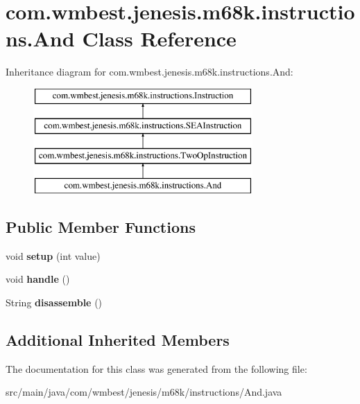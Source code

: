 \hypertarget{classcom_1_1wmbest_1_1jenesis_1_1m68k_1_1instructions_1_1And}{\section{com.\-wmbest.\-jenesis.\-m68k.\-instructions.\-And Class Reference}
\label{classcom_1_1wmbest_1_1jenesis_1_1m68k_1_1instructions_1_1And}
}
Inheritance diagram for com.\-wmbest.\-jenesis.\-m68k.\-instructions.\-And\-:\begin{figure}[H]
\begin{center}
\leavevmode
\includegraphics[height=4.000000cm]{classcom_1_1wmbest_1_1jenesis_1_1m68k_1_1instructions_1_1And}
\end{center}
\end{figure}
\subsection*{Public Member Functions}
\begin{DoxyCompactItemize}
\item 
\hypertarget{classcom_1_1wmbest_1_1jenesis_1_1m68k_1_1instructions_1_1And_a07f235df047551864221dd47fc2d9ad7}{void {\bfseries setup} (int value)}\label{classcom_1_1wmbest_1_1jenesis_1_1m68k_1_1instructions_1_1And_a07f235df047551864221dd47fc2d9ad7}

\item 
\hypertarget{classcom_1_1wmbest_1_1jenesis_1_1m68k_1_1instructions_1_1And_aab736f92fc0f72bbb3d21745bd3350dc}{void {\bfseries handle} ()}\label{classcom_1_1wmbest_1_1jenesis_1_1m68k_1_1instructions_1_1And_aab736f92fc0f72bbb3d21745bd3350dc}

\item 
\hypertarget{classcom_1_1wmbest_1_1jenesis_1_1m68k_1_1instructions_1_1And_a6daa43cc0a2cefdfadcfc8b3787f8736}{String {\bfseries disassemble} ()}\label{classcom_1_1wmbest_1_1jenesis_1_1m68k_1_1instructions_1_1And_a6daa43cc0a2cefdfadcfc8b3787f8736}

\end{DoxyCompactItemize}
\subsection*{Additional Inherited Members}


The documentation for this class was generated from the following file\-:\begin{DoxyCompactItemize}
\item 
src/main/java/com/wmbest/jenesis/m68k/instructions/And.\-java\end{DoxyCompactItemize}
